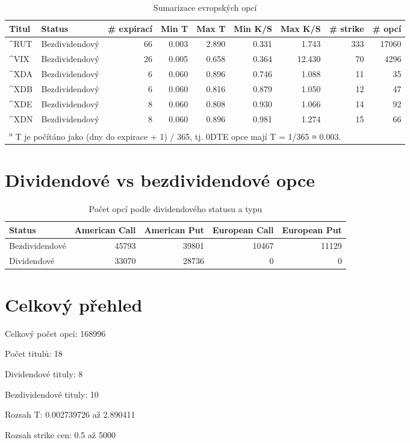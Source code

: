 \begin{table}[!h]
\centering
\caption{Sumarizace evropských opcí}
\centering
\begin{tabular}[t]{llrrrrrrr}
\toprule
Titul & Status & \# expirací & Min T & Max T & Min K/S & Max K/S & \# strike & \# opcí\\
\midrule
\textasciicircum{}RUT & Bezdividendový & 66 & 0.003 & 2.890 & 0.331 & 1.743 & 333 & 17060\\
\textasciicircum{}VIX & Bezdividendový & 26 & 0.005 & 0.658 & 0.364 & 12.430 & 70 & 4296\\
\textasciicircum{}XDA & Bezdividendový & 6 & 0.060 & 0.896 & 0.746 & 1.088 & 11 & 35\\
\textasciicircum{}XDB & Bezdividendový & 6 & 0.060 & 0.816 & 0.879 & 1.050 & 12 & 47\\
\textasciicircum{}XDE & Bezdividendový & 8 & 0.060 & 0.808 & 0.930 & 1.066 & 14 & 92\\
\addlinespace
\textasciicircum{}XDN & Bezdividendový & 8 & 0.060 & 0.896 & 0.981 & 1.274 & 15 & 66\\
\bottomrule
\multicolumn{9}{l}{\textsuperscript{a} T je počítáno jako (dny do expirace + 1) / 365, tj. 0DTE opce mají T = 1/365 ≈ 0.003.}\\
\end{tabular}
\end{table}


\section{Dividendové vs bezdividendové opce}

\begin{table}[!h]
\centering
\caption{Počet opcí podle dividendového statusu a typu}
\centering
\begin{tabular}[t]{lrrrr}
\toprule
Status & American Call & American Put & European Call & European Put\\
\midrule
Bezdividendové & 45793 & 39801 & 10467 & 11129\\
Dividendové & 33070 & 28736 & 0 & 0\\
\bottomrule
\end{tabular}
\end{table}


\section{Celkový přehled}

Celkový počet opcí: 168996 \par
Počet titulů: 18 \par
Dividendové tituly: 8 \par
Bezdividendové tituly: 10 \par
Rozsah T: 0.002739726 až 2.890411 \par
Rozsah strike cen: 0.5 až 5000 \par
